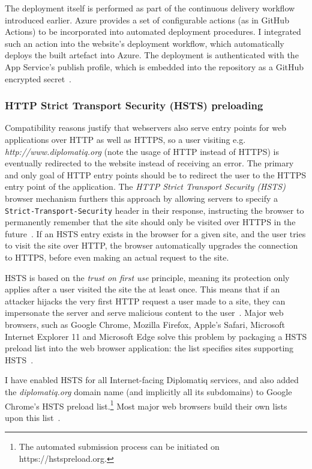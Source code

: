 The deployment itself is performed as part of the continuous delivery workflow introduced earlier. Azure provides a set of configurable actions (as in GitHub Actions) to be incorporated into automated deployment procedures. I integrated such an action into the website's deployment workflow, which automatically deploys the built artefact into Azure. The deployment is authenticated with the App Service's publish profile, which is embedded into the repository as a GitHub encrypted secret~\cite{github-encrypted-secrets}.

\subsubsection{HTTP Strict Transport Security (HSTS) preloading}

Compatibility reasons justify that webservers also serve entry points for web applications over HTTP as well as HTTPS, so a user visiting e.g. \emph{http://www.diplomatiq.org} (note the usage of HTTP instead of HTTPS) is eventually redirected to the website instead of receiving an error. The primary and only goal of HTTP entry points should be to redirect the user to the HTTPS entry point of the application. The \emph{HTTP Strict Transport Security (HSTS)} browser mechanism furthers this approach by allowing servers to specify a \lstinline{Strict-Transport-Security} header in their response, instructing the browser to permanently remember that the site should only be visited over HTTPS in the future~\cite{garron2013state}. If an HSTS entry exists in the browser for a given site, and the user tries to visit the site over HTTP, the browser automatically upgrades the connection to HTTPS, before even making an actual request to the site.

HSTS is based on the \emph{trust on first use} principle, meaning its protection only applies after a user visited the site the at least once. This means that if an attacker hijacks the very first HTTP request a user made to a site, they can impersonate the server and serve malicious content to the user~\cite{rfc6977}. Major web browsers, such as Google Chrome, Mozilla Firefox, Apple's Safari, Microsoft Internet Explorer 11 and Microsoft Edge solve this problem by packaging a HSTS preload list into the web browser application: the list specifies sites supporting HSTS~\cite{hstspreload}.

I have enabled HSTS for all Internet-facing Diplomatiq services, and also added the \emph{diplomatiq.org} domain name (and implicitly all its subdomains) to Google Chrome's HSTS preload list.\footnote{The automated submission process can be initiated on https://hstspreload.org.} Most major web browsers build their own lists upon this list~\cite{hstspreload}.


